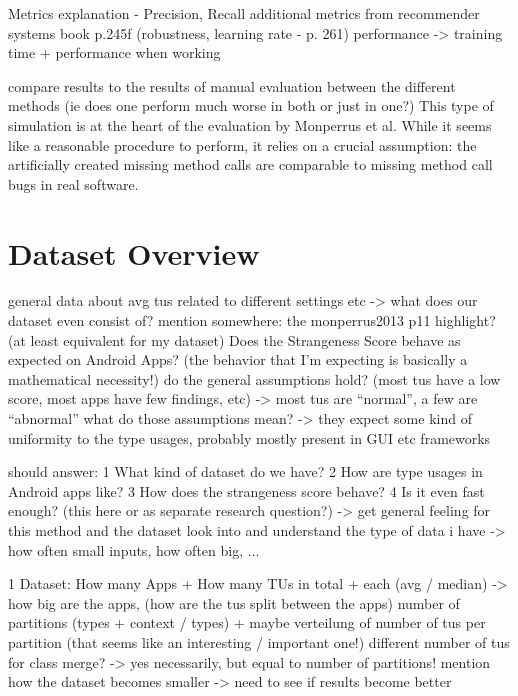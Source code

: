 Metrics explanation - Precision, Recall
    additional metrics from recommender systems book p.245f (robustness, learning rate - p. 261)
    performance -> training time + performance when working

compare results to the results of manual evaluation between the different methods (ie does one perform much worse in both or just in one?)
This type of simulation is at the heart of the evaluation by Monperrus et al.
While it seems like a reasonable procedure to perform, it relies on a crucial assumption: the artificially created missing method calls are comparable to missing method call bugs in real software.

\section{Dataset Overview}

general data about avg tus related to different settings etc -> what does our dataset even consist of?
mention somewhere: the monperrus2013 p11 highlight? (at least equivalent for my dataset)
Does the Strangeness Score behave as expected on Android Apps? (the behavior that I'm expecting is basically a mathematical necessity!)
    do the general assumptions hold? (most tus have a low score, most apps have few findings, etc)
        -> most tus are ``normal'', a few are ``abnormal''
        what do those assumptions mean? -> they expect some kind of uniformity to the type usages, probably mostly present in GUI etc frameworks

should answer:
    1 What kind of dataset do we have?
    2 How are type usages in Android apps like?
    3 How does the strangeness score behave?
    4 Is it even fast enough? (this here or as separate research question?)
-> get general feeling for this method and the dataset
look into and understand the type of data i have -> how often small inputs, how often big, ...

1 Dataset:
    How many Apps + How many TUs in total + each (avg / median) -> how big are the apps, (how are the tus split between the apps)
    number of partitions (types + context / types) + maybe verteilung of number of tus per partition (that seems like an interesting / important one!)
    different number of tus for class merge? -> yes necessarily, but equal to number of partitions!
        mention how the dataset becomes smaller -> need to see if results become better

